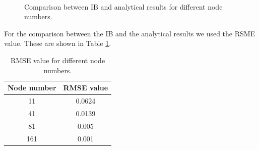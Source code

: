 \begin{figure}[H]
	\centering
	\quad
	\\
	\quad
	\caption{Comparison between IB and analytical results for different node numbers.}
	\label{fig:C3_penalizationResultNodeNumber}
\end{figure}

For the comparison between the IB and the analytical results we used the RSME value. These are shown in Table \ref{table:C3_penalizationResultNodeNumberRMSE}.

\begin{table}[H]
\centering
\begin{tabular}{c | c}
	Node number & RMSE value \\ \hline \hline
	11 & 0.0624 \\ \hline
	41 & 0.0139 \\ \hline
	81 & 0.005 \\ \hline
	161 & 0.001
\end{tabular}
\caption{RMSE value for different node numbers.}
\label{table:C3_penalizationResultNodeNumberRMSE}
\end{table}

